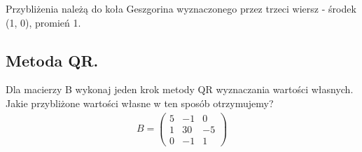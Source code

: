 \documentclass[12pt]{article}
\begin{document}
    Przybliżenia należą do koła Geszgorina wyznaczonego przez trzeci wiersz - środek (1, 0), promień 1.

    \subsection{Metoda QR.}

    \begin{exercise}
        Dla macierzy B wykonaj jeden krok metody QR wyznaczania wartości własnych. Jakie przybliżone wartości własne w
        ten sposób otrzymujemy?
        \begin{align*}
            B =
            \begin{pmatrix}
                5 & -1 & 0\\
                1 & 30 & -5\\
                0 & -1 & 1
            \end{pmatrix}
        \end{align*}
    \end{exercise}
\end{document}
